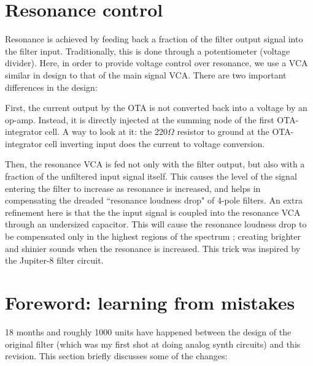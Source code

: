 \documentclass[a4paper,11pt]{article}
\begin{document}
\section{Resonance control}

Resonance is achieved by feeding back a fraction of the filter output signal into the filter input. Traditionally, this is done through a potentiometer (voltage divider). Here, in order to provide voltage control over resonance, we use a VCA similar in design to that of the main signal VCA. There are two important differences in the design:

First, the current output by the OTA is not converted back into a voltage by an op-amp. Instead, it is directly injected at the summing node of the first OTA-integrator cell. A way to look at it: the $220 \Omega$ resistor to ground at the OTA-integrator cell inverting input does the current to voltage conversion.

Then, the resonance VCA is fed not only with the filter output, but also with a fraction of the unfiltered input signal itself. This causes the level of the signal entering the filter to increase as resonance is increased, and helps in compensating the dreaded ``resonance loudness drop" of 4-pole filters. An extra refinement here is that the the input signal is coupled into the resonance VCA through an undersized capacitor. This will cause the resonance loudness drop to be compensated only in the highest regions of the spectrum ; creating brighter and shinier sounds when the resonance is increased. This trick was inspired by the Jupiter-8 filter circuit.

\section*{Foreword: learning from mistakes}

18 months and roughly 1000 units have happened between the design of the original filter (which was my first shot at doing analog synth circuits) and this revision. This section briefly discusses some of the changes:
\end{document}
